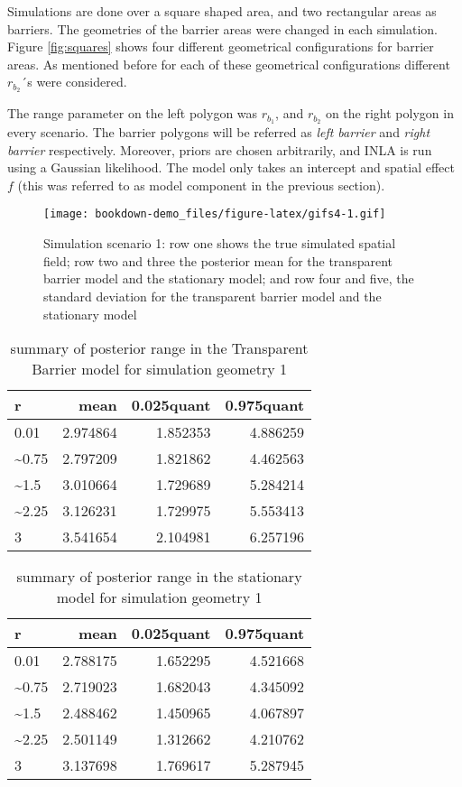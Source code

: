 \documentclass[
]{book}
\begin{document}
Simulations are done over a square shaped area, and two rectangular areas as barriers. The geometries of the barrier areas were changed in each simulation. Figure \ref{fig:squares} shows four different geometrical configurations for barrier areas. As mentioned before for each of these geometrical configurations different \(r_{b_2}\)´s were considered.

The range parameter on the left polygon was \(r_{b_1}\), and \(r_{b_2}\) on the right polygon in every scenario. The barrier polygons will be referred as \emph{left barrier} and \emph{right barrier} respectively. Moreover, priors are chosen arbitrarily, and INLA is run using a Gaussian likelihood. The model only takes an intercept and spatial effect \(f\) (this was referred to as model component in the previous section).

\begin{figure}
\centering
\texttt{[image: bookdown-demo\_files/figure-latex/gifs4-1.gif]}
\caption{\label{fig:gifs4}Simulation scenario 1: row one shows the true simulated spatial field; row two and three the posterior mean for the transparent barrier model and the stationary model; and row four and five, the standard deviation for the transparent barrier model and the stationary model}
\end{figure}

\begin{table}

\caption{\label{tab:t1}summary of posterior range in the Transparent Barrier model for simulation geometry 1}
\centering
\begin{tabular}[t]{l|r|r|r}
\hline
r & mean & 0.025quant & 0.975quant\\
\hline
0.01 & 2.974864 & 1.852353 & 4.886259\\
\hline
\textasciitilde{}0.75 & 2.797209 & 1.821862 & 4.462563\\
\hline
\textasciitilde{}1.5 & 3.010664 & 1.729689 & 5.284214\\
\hline
\textasciitilde{}2.25 & 3.126231 & 1.729975 & 5.553413\\
\hline
3 & 3.541654 & 2.104981 & 6.257196\\
\hline
\end{tabular}
\end{table}

\begin{table}

\caption{\label{tab:t2}summary of posterior range in the stationary model for simulation geometry 1}
\centering
\begin{tabular}[t]{l|r|r|r}
\hline
r & mean & 0.025quant & 0.975quant\\
\hline
0.01 & 2.788175 & 1.652295 & 4.521668\\
\hline
\textasciitilde{}0.75 & 2.719023 & 1.682043 & 4.345092\\
\hline
\textasciitilde{}1.5 & 2.488462 & 1.450965 & 4.067897\\
\hline
\textasciitilde{}2.25 & 2.501149 & 1.312662 & 4.210762\\
\hline
3 & 3.137698 & 1.769617 & 5.287945\\
\hline
\end{tabular}
\end{table}
\end{document}
